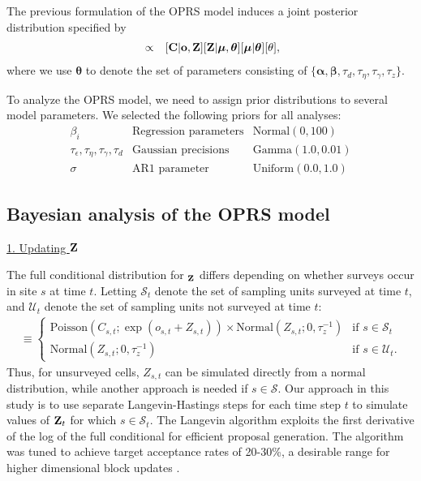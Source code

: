 \documentclass[12pt,fleqn]{article}
\begin{document}
\begin{flushleft}
\hspace{.5in}  The previous formulation of the OPRS model induces a joint posterior distribution specified by
\begin{eqnarray}
  [{\bf Z},\boldsymbol{\mu},\boldsymbol{\theta}| {\bf C},{\bf o}] & \propto & [{\bf C} | {\bf o}, {\bf Z}][{\bf Z} | \boldsymbol{\mu},\boldsymbol{\theta}] [\boldsymbol{\mu} | \boldsymbol{\theta}] [\theta],
  \label{eq:hmod}
\end{eqnarray}
where we use $\boldsymbol{\theta}$ to denote the set of parameters consisting of $ \{ \boldsymbol{\alpha},\boldsymbol{\beta},\tau_d,\tau_\eta,\tau_\gamma,\tau_z \}$.

\hspace{.5in}To analyze the OPRS model, we need to assign prior distributions to several model parameters.  We selected the following priors for all analyses:
\begin{eqnarray*}
  \beta_i & \textrm{Regression parameters} & \textrm{Normal}(0,100) \\
  \tau_\epsilon, \tau_\eta, \tau_\gamma, \tau_d  & \textrm{Gaussian precisions} & \textrm{Gamma}(1.0,0.01) \\
  \sigma & \textrm{AR1 parameter} & \textrm{Uniform}(0.0,1.0)
   \label{eq:priors}
\end{eqnarray*}



\subsection{Bayesian analysis of the OPRS model}


\underline{1. Updating ${\bf Z}$}

The full conditional distribution for ${\bf_Z}$ differs depending on whether surveys occur in site $s$ at time $t$. Letting $\mathcal{S}_t$ denote the set of sampling units surveyed at time $t$, and $\mathcal{U}_t$ denote the set of sampling units not surveyed at time $t$:
\begin{eqnarray*}
  [{\bf Z}|\cdot] \equiv \begin{cases}
                   \textrm{Poisson}(C_{s,t};\exp(o_{s,t} + Z_{s,t})) \times \textrm{Normal}(Z_{s,t}; 0,\tau_z^{-1}) & \textrm{if } s \in \mathcal{S}_t \\
                     \textrm{Normal}(Z_{s,t}; 0,\tau_z^{-1}) & \textrm{if } s \in \mathcal{U}_t.
                  \end{cases}
\end{eqnarray*}
Thus, for unsurveyed cells, $Z_{s,t}$ can be simulated directly from a normal distribution, while another approach
is needed if $s \in \mathcal{S}$.  Our approach in this study is to use separate Langevin-Hastings steps \citep[see e.g.,][section 7.1.4]{GivensHoeting2005} for each
time step $t$ to simulate values of ${\bf Z}_t$ for which $s \in \mathcal{S}_t$.  The Langevin algorithm exploits the first derivative of the log of the full conditional for efficient proposal generation.  The algorithm was tuned to achieve target acceptance rates of 20-30\%, a desirable range for higher dimensional block updates \citep{GelmanEtAl2004}.


\end{flushleft}
\end{document}
